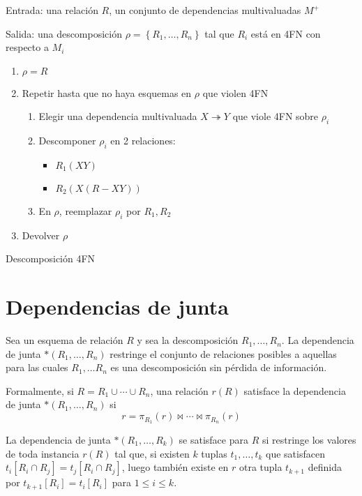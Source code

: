 \documentclass[a4paper, twoside]{article}
\begin{document}
\begin{algorithm}[H]
	Entrada: una relación $R$, un conjunto de dependencias multivaluadas $M^{+}$

	Salida: una descomposición $\rho=\left\{ R_{1},\ldots,R_{n}\right\}$ tal que $R_{i}$ está en 4FN con respecto a $M_{i}$
	\begin{enumerate}
		\item $\rho=R$
		\item Repetir hasta que no haya esquemas en $\rho$ que violen 4FN
		\begin{enumerate}
			\item Elegir una dependencia multivaluada $X\twoheadrightarrow Y$ que viole 4FN sobre $\rho_{i}$
			\item Descomponer $\rho_{i}$ en 2 relaciones:
			\begin{itemize}
				\item $R_{1}\left(XY\right)$
				\item $R_{2}\left(X(R-XY)\right)$
			\end{itemize}
			\item En $\rho$, reemplazar $\rho_{i}$ por $R_{1},R_{2}$
		\end{enumerate}
		\item Devolver $\rho$
	\end{enumerate}
	\caption{Descomposición 4FN}
\end{algorithm}

\section{Dependencias de junta}
Sea un esquema de relación $R$ y sea la descomposición $R_{1},\ldots,R_{n}$. La dependencia de junta $*\left(R_{1},\ldots,R_{n}\right)$ restringe el conjunto de relaciones posibles a aquellas para las cuales $R_{1},\ldots R_{n}$ es una descomposición sin pérdida de información.

Formalmente, si $R=R_{1}\cup\cdots\cup R_{n}$, una relación $r(R)$ satisface la dependencia de junta $*\left(R_{1},\ldots,R_{n}\right)$ si 
\[
	r=\pi_{R_{1}}(r)\bowtie\cdots\bowtie\pi_{R_{n}}(r)
\]

La dependencia de junta $*\left(R_{1},\ldots,R_{k}\right)$ se satisface para $R$ si restringe los valores de toda instancia $r(R)$ tal que, si existen $k$ tuplas $t_{1},\ldots,t_{k}$ que satisfacen $t_{i}\left[R_{i}\cap R_{j}\right]=t_{j}\left[R_{i}\cap R_{j}\right]$, luego también existe en $r$ otra tupla $t_{k+1}$ definida por $t_{k+1}\left[R_{i}\right]=t_{i}\left[R_{i}\right]$ para $1\leq i\leq k$.
\end{document}
